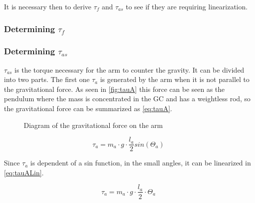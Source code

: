 It is necessary then to derive $\tau_f$ and $\tau_{as}$ to see if they are requiring linearization.

\subsubsection*{Determining $\tau_{f}$}

\subsubsection*{Determining $\tau_{as}$}

$\tau_{as}$ is the torque necessary for the arm to counter the gravity. It can be divided into two parts. The first one $\tau_a$ is generated by the arm when it is not parallel to the gravitational force. As seen in \autoref{fig:tauA} this force can be seen as the pendulum where the mass is concentrated in the GC and has a weightless rod, so the gravitational force can be summarized as \autoref{eq:tauA}.

\begin{figure}[htbp]
	\caption{Diagram of the gravitational force on the arm}\label{fig:tauA}
\end{figure}

\begin{equation}\label{eq:tauA}
	\tau_a=m_a\cdot g \cdot \frac{l_a}{2} sin(\Theta_a)
\end{equation}
\startexplain
{}
\stopexplain

Since $\tau_a$ is dependent of a sin function, in the small angles, it can be linearized in \autoref{eq:tauALin}.

\begin{equation}\label{eq:tauALin}
\tau_a=m_a\cdot g \cdot \frac{l_a}{2}\cdot\Theta_a
\end{equation}